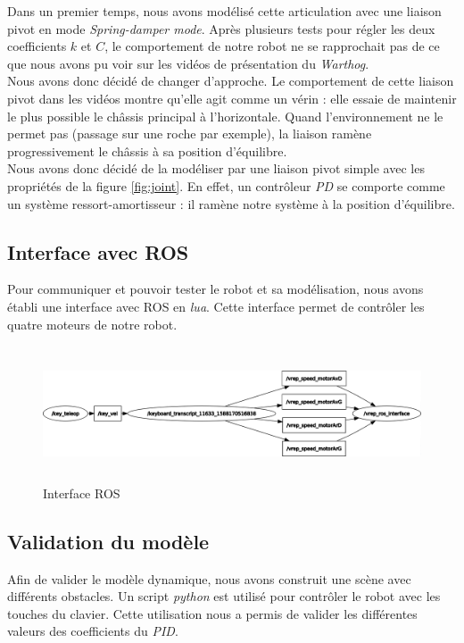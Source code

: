\documentclass[12pt, openany]{report}
\begin{document}
Dans un premier temps, nous avons modélisé cette articulation avec une liaison pivot en mode \textit{Spring-damper mode}. Après plusieurs tests pour régler les deux coefficients $k$ et $C$, le comportement de notre robot ne se rapprochait pas de ce que nous avons pu voir sur les vidéos de présentation du \textit{Warthog}.\\

Nous avons donc décidé de changer d'approche. Le comportement de cette liaison pivot dans les vidéos montre qu'elle agit comme un vérin : elle essaie de maintenir le plus possible le châssis principal à l'horizontale. Quand l'environnement ne le permet pas (passage sur une roche par exemple), la liaison ramène progressivement le châssis à sa position d'équilibre.\\

Nous avons donc décidé de la modéliser par une liaison pivot simple avec les propriétés de la figure \ref{fig:joint}. En effet, un contrôleur \textit{PD} se comporte comme un système ressort-amortisseur : il ramène notre système à la position d'équilibre. 

\subsection{Interface avec \textsc{ROS}}
Pour communiquer et pouvoir tester le robot et sa modélisation, nous avons établi une interface avec \textsc{ROS} en \textit{lua}. Cette interface permet de contrôler les quatre moteurs de notre robot.
\begin{figure}[H]
     \centering
     \includegraphics[width=\textwidth, height=4cm]{rosgraph.png}
     \caption{Interface \textsc{ROS}}
     \label{fig:rosgraph}     
\end{figure}

\subsection{Validation du modèle}
Afin de valider le modèle dynamique, nous avons construit une scène avec différents obstacles. Un script \textit{python} est utilisé pour contrôler le robot avec les touches du clavier. Cette utilisation nous a permis de valider les différentes valeurs des coefficients du \textit{PID}.\\
\end{document}
